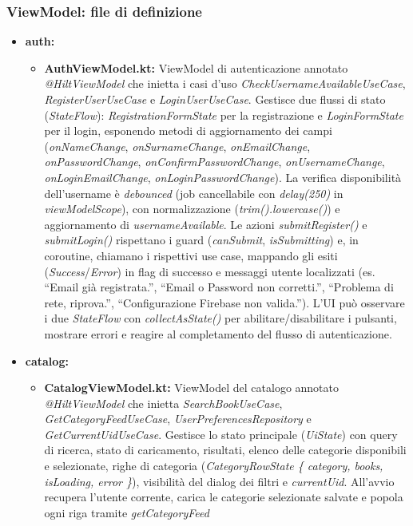 \documentclass{article}
\begin{document}
\subsubsection{ViewModel: file di definizione}
\begin{itemize}
  \item \textbf{auth:}
  \begin{itemize}
    \item \textbf{AuthViewModel.kt:} ViewModel di autenticazione annotato \textit{@HiltViewModel} che inietta i casi d’uso \textit{CheckUsernameAvailableUseCase}, 
    \textit{RegisterUserUseCase} e \textit{LoginUserUseCase}. Gestisce due flussi di stato (\textit{StateFlow}): \textit{RegistrationFormState} per la registrazione e \textit{LoginFormState} per il login, esponendo metodi di aggiornamento 
    dei campi (\textit{onNameChange}, \textit{onSurnameChange}, \textit{onEmailChange}, \textit{onPasswordChange}, \textit{onConfirmPasswordChange}, \textit{onUsernameChange}, \textit{onLoginEmailChange}, \textit{onLoginPasswordChange}). 
    La verifica disponibilità dell’username è \emph{debounced} (job cancellabile con \textit{delay(250)} in \textit{viewModelScope}), con normalizzazione (\textit{trim().lowercase()}) e aggiornamento di \textit{usernameAvailable}. 
    Le azioni \textit{submitRegister()} e \textit{submitLogin()} rispettano i guard (\textit{canSubmit}, \textit{isSubmitting}) e, in coroutine, chiamano i rispettivi use case, mappando gli esiti (\textit{Success}/\textit{Error}) 
    in flag di successo e messaggi utente localizzati (es. “Email già registrata.”, “Email o Password non corretti.”, “Problema di rete, riprova.”, “Configurazione Firebase non valida.”). L’UI può osservare i due \textit{StateFlow} con \textit{collectAsState()} 
    per abilitare/disabilitare i pulsanti, mostrare errori e reagire al completamento del flusso di autenticazione.
  \end{itemize}
  \item \textbf{catalog:}
  \begin{itemize}
    \item \textbf{CatalogViewModel.kt:} ViewModel del catalogo annotato \textit{@HiltViewModel} che inietta \textit{SearchBookUseCase}, \textit{GetCategoryFeedUseCase}, \textit{UserPreferencesRepository} e \textit{GetCurrentUidUseCase}. Gestisce lo stato principale (\textit{UiState}) con query di ricerca, stato di caricamento, risultati, 
    elenco delle categorie disponibili e selezionate, righe di categoria (\textit{CategoryRowState \{ category, books, isLoading, error \}}), visibilità del dialog dei filtri e \textit{currentUid}. All’avvio recupera l’utente corrente, carica le categorie selezionate salvate e popola ogni riga tramite \textit{getCategoryFeed} 

\end{itemize}
\end{itemize}
\end{document}
